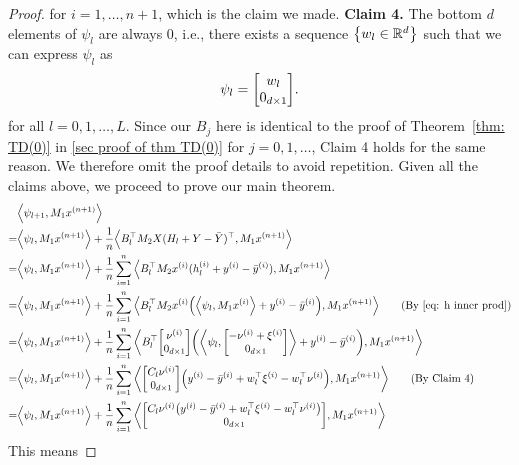 \documentclass{article}
\newcommand{\explain}[1]{\tag*{(#1)}}
\newcommand{\R}{\mathbb{R}}
\newcommand{\indot}[2]{{\left<#1, #2\right>}}
\begin{document}
\begin{proof}
    for $i = 1, \dots, n + 1$, which is the claim we made.
    \textbf{Claim 4.} The bottom $d$ elements of $\psi_l$ are always 0, i.e., there exists a sequence $\qty{w_l \in \R^d}$ such that we can express $\psi_l$ as
    \begin{align}
        \psi_l = \mqty[w_l \\ 0_{d \times 1}]. \label{eq: avg theta_l sparsity}
    \end{align}
    for all $l = 0,1,\dots, L$.
    Since our $B_j$ here is identical to the proof of Theorem~\ref{thm: TD(0)} in \ref{sec proof of thm TD(0)} for $j = 0, 1, \dots$, Claim 4 holds for the same reason.
    We therefore omit the proof details to avoid repetition.
    Given all the claims above, we proceed to prove our main theorem.
     \begin{align}
        &\indot{\psi_{l+1}}{M_1 x^{(n+1)}}\\
        =&\indot{\psi_l}{M_1 x^{(n+1)}} + \frac{1}{n}\indot{B_l^\top M_2 X (H_l + Y - \bar{Y})^\top}{M_1 x^{(n+1)}}\\
        =&\indot{\psi_l}{M_1 x^{(n+1)}} + \frac{1}{n}\sum_{i=1}^n \indot{B_l^\top M_2 x^{(i)} (h_l^{(i)} + y^{(i)} - \bar{y}^{(i)})}{M_1 x^{(n+1)}}\\
        =&\indot{\psi_l}{M_1 x^{(n+1)}} +
        \frac{1}{n} \sum_{i=1}^n \indot{B_l^\top M_2 x^{(i)} \qty(\indot{\psi_l}{M_1 x^{(i)}} + y^{(i)} - \bar{y}^{(i)})}{M_1 x^{(n+1)}} \explain{By \eqref{eq: h inner prod}}\\
        =&\indot{\psi_l}{M_1 x^{(n+1)}} +
        \frac{1}{n} \sum_{i=1}^n
        \indot{B_l^\top \mqty[\nu^{(i)}\\0_{d\times 1}]
        \qty( \indot{\psi_l}{\mqty[-\nu^{(i)} + \xi^{(i)}\\ 0_{d\times 1}]} + y^{(i)} - \bar{y}^{(i)})}{M_1 x^{(n+1)}}\\
        =&\indot{\psi_l}{M_1 x^{(n+1)}} +
        \frac{1}{n} \sum_{i=1}^n
        \indot{\mqty[C_l \nu^{(i)}\\0_{d\times 1}]
        \qty( y^{(i)} - \bar{y}^{(i)} +  w_l^\top \xi^{(i)} - w_l^\top \nu^{(i)} )}{M_1 x^{(n+1)}} \explain{By Claim 4}\\
        =&\indot{\psi_l}{M_1 x^{(n+1)}} +
        \frac{1}{n} \sum_{i=1}^n
        \indot{\mqty[C_l \nu^{(i)} \qty(y^{(i)} - \bar{y}^{(i)} + w_l^\top \xi^{(i)} - w_l^\top \nu^{(i)})\\0_{d\times 1}]}
        {M_1 x^{(n+1)}}\\
    \end{align}
    This means

\end{proof}
\end{document}
